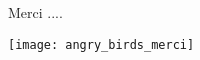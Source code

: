 \documentclass[]{beamer}
\begin{document}
\begin{frame}[plain]
  \begin{center}
    \begin{huge}
      Merci ....
      
    \end{huge}

  \end{center}

  \texttt{[image: angry\_birds\_merci]}
\end{frame}
\end{document}
